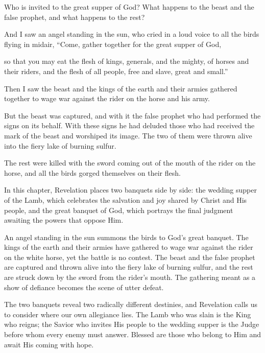 \begin{ScriptureBox2}{Who is invited to the great supper of God? What happens to the beast and the false prophet, and what happens to the rest?}

\item[19:17] And I saw an angel standing in the sun, who cried in a loud voice to all the birds flying in midair, ``Come, gather together for the great supper of God,

\item[19:18] so that you may eat the flesh of kings, generals, and the mighty, of horses and their riders, and the flesh of all people, free and slave, great and small.''

\item[19:19] Then I saw the beast and the kings of the earth and their armies gathered together to wage war against the rider on the horse and his army.

\item[19:20] But the beast was captured, and with it the false prophet who had performed the signs on its behalf. With these signs he had deluded those who had received the mark of the beast and worshiped its image. The two of them were thrown alive into the fiery lake of burning sulfur.

\item[19:21] The rest were killed with the sword coming out of the mouth of the rider on the horse, and all the birds gorged themselves on their flesh.

\end{ScriptureBox2}


In this chapter, Revelation places two banquets side by side: the wedding supper of the Lamb, which celebrates the salvation and joy shared by Christ and His people, and the great banquet of God, which portrays the final judgment awaiting the powers that oppose Him.

An angel standing in the sun summons the birds to God's great banquet. The kings of the earth and their armies have gathered to wage war against the rider on the white horse, yet the battle is no contest. The beast and the false prophet are captured and thrown alive into the fiery lake of burning sulfur, and the rest are struck down by the sword from the rider's mouth. The gathering meant as a show of defiance becomes the scene of utter defeat.

The two banquets reveal two radically different destinies, and Revelation calls us to consider where our own allegiance lies. The Lamb who was slain is the King who reigns; the Savior who invites His people to the wedding supper is the Judge before whom every enemy must answer. Blessed are those who belong to Him and await His coming with hope.


